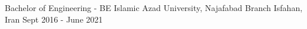 
\begin{cventries}

  \cventry
    {Bachelor of Engineering - BE} %
    {Islamic Azad University, Najafabad Branch} %
    {Isfahan, Iran} %
    {Sept 2016 - June 2021} %
    {
      \begin{cvitems} %
      \end{cvitems}
    }

\end{cventries}
